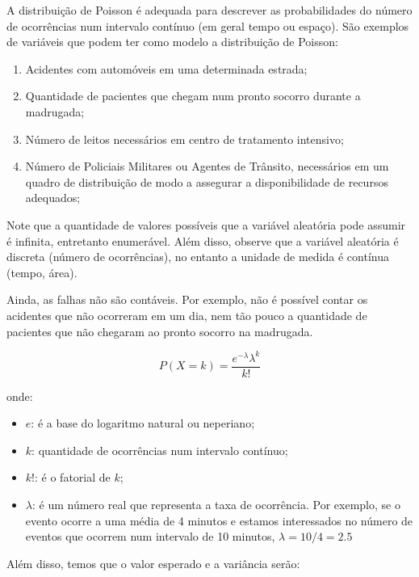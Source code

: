   
\inic A distribuição de Poisson é adequada para descrever as probabilidades do número de ocorrências num intervalo contínuo (em geral tempo ou espaço). São exemplos de variáveis que podem ter como modelo a distribuição de Poisson:

\begin{enumerate}
    \item Acidentes com automóveis em uma determinada estrada;
    \item Quantidade de pacientes que chegam num pronto socorro durante a madrugada;
    \item  Número de leitos necessários em centro de tratamento intensivo;
    \item  Número de Policiais Militares ou Agentes de Trânsito, necessários em um quadro de distribuição de modo a assegurar a disponibilidade de recursos adequados;
\end{enumerate}



\inic Note que a quantidade de valores possíveis que a variável aleatória pode assumir é infinita, entretanto enumerável. Além disso, observe que a variável aleatória é discreta (número de ocorrências), no entanto a unidade de medida é contínua (tempo, área).\vskip0.3cm

Ainda, as falhas não são contáveis. Por exemplo, não é possível contar os acidentes que não ocorreram em um dia, nem tão pouco a quantidade de pacientes que não chegaram ao pronto socorro na madrugada.
 
 
\begin{equation}
    P\left(X=k\right)= \frac{e^{-\lambda}\lambda^{k}}{k!}
\end{equation}

onde:

\begin{itemize}
\item $e$: é a base do logaritmo natural ou neperiano;
\item $k$: quantidade de ocorrências num intervalo contínuo;
\item $k!$: é o fatorial de $k$; 
\item $\lambda$: é um número real que representa a taxa de ocorrência. Por exemplo, se o evento ocorre a uma média de 4 minutos e estamos interessados no número de eventos que ocorrem num intervalo de 10 minutos, $\lambda={10}/{4}=2.5$
\end{itemize}

  
Além disso, temos que o valor esperado e a variância serão: 

